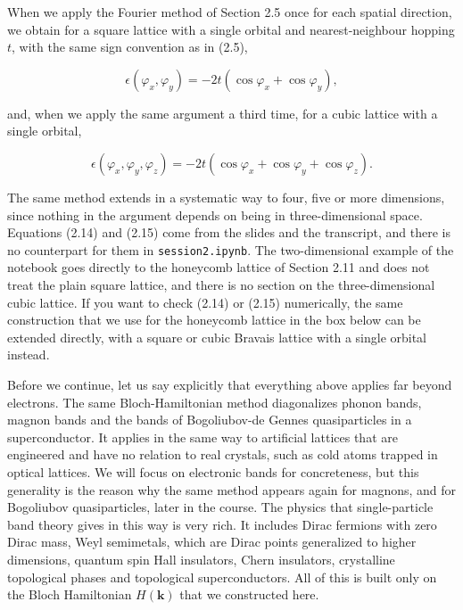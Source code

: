 When we apply the Fourier method of Section 2.5 once for each spatial direction, we obtain for a
square lattice with a single orbital and nearest-neighbour hopping $t$, with the same sign
convention as in (2.5),

\begin{equation}\epsilon(\varphi_x,\varphi_y) = -2t\left(\cos\varphi_x + \cos\varphi_y\right),\end{equation}

and, when we apply the same argument a third time, for a cubic lattice with a single orbital,

\begin{equation}\epsilon(\varphi_x,\varphi_y,\varphi_z) = -2t\left(\cos\varphi_x+\cos\varphi_y+\cos\varphi_z\right).
\end{equation}

The same method extends in a systematic way to four, five or more dimensions, since nothing in the
argument depends on being in three-dimensional space. Equations (2.14) and (2.15) come from the
slides and the transcript, and there is no counterpart for them in \texttt{session2.ipynb}. The
two-dimensional example of the notebook goes directly to the honeycomb lattice of Section 2.11 and
does not treat the plain square lattice, and there is no section on the three-dimensional cubic
lattice. If you want to check (2.14) or (2.15) numerically, the same construction that we use for the
honeycomb lattice in the box below can be extended directly, with a square or cubic Bravais lattice
with a single orbital instead.

Before we continue, let us say explicitly that everything above applies far beyond electrons. The same Bloch-Hamiltonian method diagonalizes phonon
bands, magnon bands and the bands of Bogoliubov-de Gennes quasiparticles in a superconductor. It
applies in the same way to artificial lattices that are engineered and have no relation to real
crystals, such as cold atoms trapped in optical lattices. We will focus on electronic bands for
concreteness, but this generality is the reason why the same method appears again for magnons, and
for Bogoliubov quasiparticles, later in the course. The physics that single-particle band theory
gives in this way is very rich. It includes Dirac fermions with zero Dirac mass, Weyl semimetals,
which are Dirac points generalized to higher dimensions, quantum spin Hall insulators, Chern
insulators, crystalline topological phases and topological superconductors. All of this is built only
on the Bloch Hamiltonian $H(\mathbf{k})$ that we constructed here.

